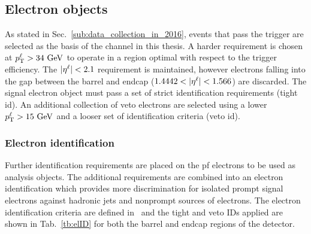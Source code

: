 \subsection{Electron objects}
\label{sub:el}

As stated in Sec.~\ref{sub:data_collection_in_2016}, events that pass the \eTrigger{} trigger are selected as the basis of the \eJets{} channel in this thesis.
A harder \LPT{} requirement is chosen at $p_{\mathrm{T}}^{\ell}>34\mathrm{~Ge\hspace{-.08em}V}^{}$ to operate in a region optimal with respect to the trigger efficiency.
The $\lvert \eta^{\ell} \rvert{}<2.1$ requirement is maintained, however electrons falling into the gap between the barrel and endcap ($1.4442<\lvert \eta^{\ell} \rvert<1.566$) are discarded.
The signal electron object must pass a set of strict identification requirements (tight \acrshort{id}).
An additional collection of veto electrons are selected using a lower $p_{\mathrm{T}}^{\ell}>15\mathrm{~Ge\hspace{-.08em}V}^{}$ and a looser set of identification criteria (veto \acrshort{id}).

\subsubsection{Electron identification}
\label{ssub:el}
Further identification requirements are placed on the \acrshort{pf} electrons to be used as analysis objects. 
The additional requirements are combined into an electron identification which provides more discrimination for isolated prompt signal electrons against hadronic jets and nonprompt sources of electrons.
The electron identification criteria are defined in~\cite{Event:eSFMethod} and the tight and veto IDs applied are shown in Tab.~\ref{tb:elID} for both the barrel and endcap regions of the detector. 

